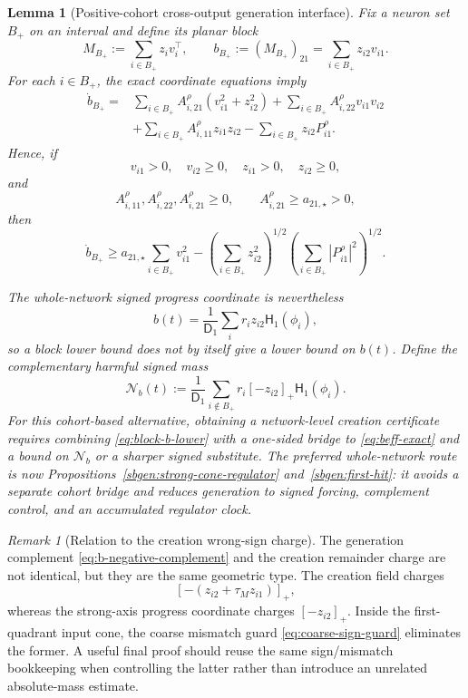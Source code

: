 \documentclass{article} %
\theoremstyle{plain}
\newtheorem{lemma}[theorem]{Lemma}
\theoremstyle{definition}
\theoremstyle{remark}
\newtheorem{remark}[theorem]{Remark}
\begin{document}
\begin{lemma}[Positive-cohort cross-output generation interface]
\label{lem:positive-cohort-generation-interface}
Fix a neuron set $B_+$ on an interval and define its planar block
\[
M_{B_+}:=\sum_{i\in B_+}z_iv_i^\top,
\qquad
b_{B_+}:=(M_{B_+})_{21}
=\sum_{i\in B_+}z_{i2}v_{i1}.
\]
For each $i\in B_+$, the exact coordinate equations imply
\[
\boxed{
\begin{aligned}
\dot b_{B_+}
={}&
\sum_{i\in B_+}
A_{i,21}^\rho(v_{i1}^2+z_{i2}^2)
+
\sum_{i\in B_+}A_{i,22}^\rho v_{i1}v_{i2}
\\
&+
\sum_{i\in B_+}A_{i,11}^\rho z_{i1}z_{i2}
-
\sum_{i\in B_+}z_{i2}P_{i1}^\rho.
\end{aligned}
}
\tag{block-b-generation}\label{eq:block-b-generation}
\]
Hence, if
\[
v_{i1}>0,
\quad
v_{i2}\ge0,
\quad
z_{i1}>0,
\quad
z_{i2}\ge0,
\]
and
\[
A_{i,11}^\rho,A_{i,22}^\rho,A_{i,21}^\rho\ge0,
\qquad
A_{i,21}^\rho\ge a_{21,\star}>0,
\]
then
\[
\boxed{
\dot b_{B_+}
\ge
 a_{21,\star}
 \sum_{i\in B_+}v_{i1}^2
-
\left(\sum_{i\in B_+}z_{i2}^2\right)^{1/2}
\left(\sum_{i\in B_+}|P_{i1}^\rho|^2\right)^{1/2}.
}
\tag{block-b-lower}\label{eq:block-b-lower}
\]

The whole-network signed progress coordinate is nevertheless
\[
b(t)
=
\frac1{\mathsf D_1}
\sum_i r_i z_{i2}\mathsf H_1(\phi_i),
\]
so a block lower bound does not by itself give a lower bound on $b(t)$.
Define the complementary harmful signed mass
\[
\boxed{
\mathcal N_b(t)
:=
\frac1{\mathsf D_1}
\sum_{i\notin B_+}
r_i[-z_{i2}]_+\mathsf H_1(\phi_i).
}
\tag{b-negative-complement}\label{eq:b-negative-complement}
\]
For this cohort-based alternative, obtaining a network-level creation
certificate requires combining \eqref{eq:block-b-lower} with a one-sided
bridge to \eqref{eq:beff-exact} and a bound on $\mathcal N_b$ or a sharper
signed substitute.  The preferred whole-network route is now
Propositions~\ref{sbgen:strong-cone-regulator} and~\ref{sbgen:first-hit}:
it avoids a separate cohort bridge and reduces generation to signed forcing,
complement control, and an accumulated regulator clock.
\end{lemma}

\begin{remark}[Relation to the creation wrong-sign charge]
\label{rem:generation-creation-same-bad-mass}
The generation complement \eqref{eq:b-negative-complement} and the creation
remainder charge are not identical, but they are the same geometric type.
The creation field charges
\[
[-(z_{i2}+\tau_M z_{i1})]_+,
\]
whereas the strong-axis progress coordinate charges $[-z_{i2}]_+$.
Inside the first-quadrant input cone, the coarse mismatch guard
\eqref{eq:coarse-sign-guard} eliminates the former.  A useful final proof
should reuse the same sign/mismatch bookkeeping when controlling the latter
rather than introduce an unrelated absolute-mass estimate.
\end{remark}
\end{document}
